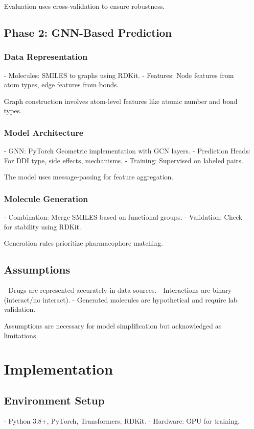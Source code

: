 \documentclass[12pt,a4paper]{article}
\begin{document}
Evaluation uses cross-validation to ensure robustness.

\subsection{Phase 2: GNN-Based Prediction}
\subsubsection{Data Representation}
- Molecules: SMILES to graphs using RDKit.
- Features: Node features from atom types, edge features from bonds.

Graph construction involves atom-level features like atomic number and bond types.

\subsubsection{Model Architecture}
- GNN: PyTorch Geometric implementation with GCN layers.
- Prediction Heads: For DDI type, side effects, mechanisms.
- Training: Supervised on labeled pairs.

The model uses message-passing for feature aggregation.

\subsubsection{Molecule Generation}
- Combination: Merge SMILES based on functional groups.
- Validation: Check for stability using RDKit.

Generation rules prioritize pharmacophore matching.

\subsection{Assumptions}
- Drugs are represented accurately in data sources.
- Interactions are binary (interact/no interact).
- Generated molecules are hypothetical and require lab validation.

Assumptions are necessary for model simplification but acknowledged as limitations.

\section{Implementation}
\label{sec:impl}

\subsection{Environment Setup}
- Python 3.8+, PyTorch, Transformers, RDKit.
- Hardware: GPU for training.
\end{document}
